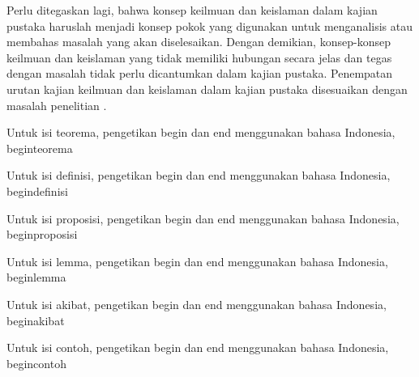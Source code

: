 Perlu ditegaskan lagi, bahwa konsep keilmuan dan keislaman dalam kajian pustaka haruslah menjadi konsep pokok yang digunakan untuk menganalisis atau membahas masalah yang akan diselesaikan. Dengan demikian, konsep-konsep keilmuan dan keislaman yang tidak memiliki hubungan secara jelas dan tegas dengan masalah tidak perlu dicantumkan dalam kajian pustaka. Penempatan urutan kajian keilmuan dan keislaman dalam kajian pustaka disesuaikan dengan masalah penelitian \cite{Enns84,CG86,GCP89,Curtain03}.

\begin{teorema}
Untuk isi teorema, pengetikan begin dan end menggunakan bahasa Indonesia, begin{teorema}
\end{teorema}
\begin{definisi}
Untuk isi definisi, pengetikan begin dan end menggunakan bahasa Indonesia, begin{definisi}
\end{definisi}
\begin{proposisi}
Untuk isi proposisi, pengetikan begin dan end menggunakan bahasa Indonesia, begin{proposisi}
\end{proposisi}
\begin{lemma}
Untuk isi lemma, pengetikan begin dan end menggunakan bahasa Indonesia, begin{lemma}
\end{lemma}
\begin{akibat}
Untuk isi akibat, pengetikan begin dan end menggunakan bahasa Indonesia, begin{akibat}
\end{akibat}
\begin{contoh}
Untuk isi contoh, pengetikan begin dan end menggunakan bahasa Indonesia, begin{contoh}
\end{contoh}